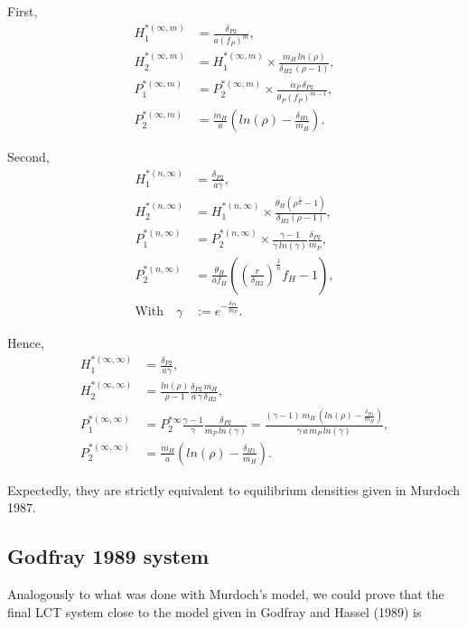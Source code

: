 \documentclass[12pt,a4paper,onecolumn]{article}
\begin{document}
First, 
\begin{align}
H_1^{*(\infty,m)} &= \frac{\delta_{P2}}{a(f_P)^m}, \nonumber \\
H_2^{*(\infty,m)} &= H_1^{*(\infty,m)} \times \frac{m_H \, ln(\rho)}{\delta_{H2} \, (\rho -1)}, \nonumber \\
P_1^{*(\infty,m)} &= P_2^{*(\infty,m)} \times \frac{\alpha_P \, \delta_{P2}}{\theta_P (f_P)^{m-1}},  \\
P_2^{*(\infty,m)} &= \frac{m_H}{a}(ln(\rho) - \frac{\delta_{H1}}{m_H}). \nonumber 
\end{align}

Second, 
\begin{align}
H_1^{*(n,\infty)} &= \frac{\delta_{P2}}{a \gamma}, \nonumber \\
H_2^{*(n,\infty)} &= H_1^{*(n,\infty)} \times \frac{\theta_{H} (\rho^{\frac{1}{n}}-1)}{\delta_{H2} (\rho-1)}, \nonumber \\
P_1^{*(n,\infty)} &= P_2^{*(n,\infty)} \times \frac{\gamma - 1}{\gamma \, ln(\gamma)} \frac{\delta_{P2}}{m_P},  \\
P_2^{*(n,\infty)} &= \frac{\theta_H}{a f_H} ((\frac{r}{\delta_{H2}})^{\frac{1}{n}}f_H -1), \nonumber \\
\text{With} \quad \gamma & := e^{-\frac{\delta_{P1}}{m_P}}. \nonumber
\end{align}

Hence, 
\begin{align}
H_1^{*(\infty,\infty)} &= \frac{\delta_{P2}}{a\gamma}, \nonumber \\
H_2^{*(\infty,\infty)} &=  \frac{ln(\rho)}{\rho-1} \frac{\delta_{P2} \, m_H}{a \, \gamma \, \delta_{H2}}, \nonumber \\
P_1^{*(\infty,\infty)} &= P_2^{* \infty} \frac{\gamma -1}{\gamma} \frac{\delta_{P2}}{m_P \, ln(\gamma)} = \frac{(\gamma-1)\, m_H \, (ln(\rho) - \frac{\delta_{H1}}{m_H})}{\gamma \,  a \,  m_P \,  ln(\gamma)}, \\
P_2^{*(\infty,\infty)} &=\frac{m_H}{a}(ln(\rho) - \frac{\delta_{H1}}{m_H}). \nonumber  
\end{align}


Expectedly, they are strictly equivalent to equilibrium densities given in Murdoch 1987.

\subsection{Godfray 1989 system}

Analogously to what was done with Murdoch's model, we could prove that the final LCT system close to the model given in Godfray and Hassel (1989) is 
\end{document}
